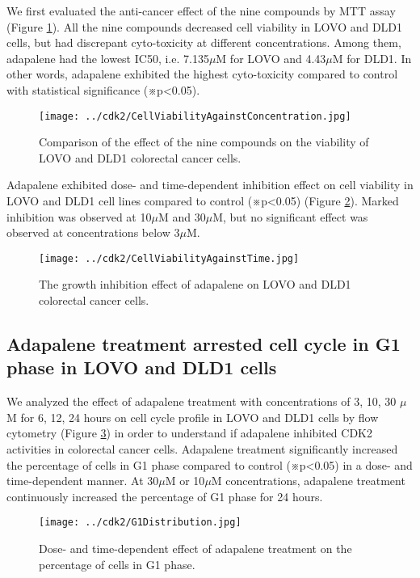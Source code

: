 We first evaluated the anti-cancer effect of the nine compounds by MTT assay (Figure \ref{cdk2:CellViabilityAgainstConcentration}). All the nine compounds decreased cell viability in LOVO and DLD1 cells, but had discrepant cyto-toxicity at different concentrations. Among them, adapalene had the lowest IC50, i.e. 7.135$\mu$M for LOVO and 4.43$\mu$M for DLD1. In other words, adapalene exhibited the highest cyto-toxicity compared to control with statistical significance (※p<0.05).

\begin{figure}
\centering
\texttt{[image: ../cdk2/CellViabilityAgainstConcentration.jpg]}
\caption{Comparison of the effect of the nine compounds on the viability of LOVO and DLD1 colorectal cancer cells.}
\label{cdk2:CellViabilityAgainstConcentration}
\end{figure}

Adapalene exhibited dose- and time-dependent inhibition effect on cell viability in LOVO and DLD1 cell lines compared to control (※p<0.05) (Figure \ref{cdk2:CellViabilityAgainstTime}). Marked inhibition was observed at 10$\mu$M and 30$\mu$M, but no significant effect was observed at concentrations below 3$\mu$M.

\begin{figure}
\centering
\texttt{[image: ../cdk2/CellViabilityAgainstTime.jpg]}
\caption{The growth inhibition effect of adapalene on LOVO and DLD1 colorectal cancer cells.}
\label{cdk2:CellViabilityAgainstTime}
\end{figure}

\subsection{Adapalene treatment arrested cell cycle in G1 phase in LOVO and DLD1 cells}

We analyzed the effect of adapalene treatment with concentrations of 3, 10, 30 $\mu$M for 6, 12, 24 hours on cell cycle profile in LOVO and DLD1 cells by flow cytometry (Figure \ref{cdk2:G1Distribution}) in order to understand if adapalene inhibited CDK2 activities in colorectal cancer cells. Adapalene treatment significantly increased the percentage of cells in G1 phase compared to control (※p<0.05) in a dose- and time-dependent manner. At 30$\mu$M or 10$\mu$M concentrations, adapalene treatment continuously increased the percentage of G1 phase for 24 hours.

\begin{figure}
\centering
\texttt{[image: ../cdk2/G1Distribution.jpg]}
\caption{Dose- and time-dependent effect of adapalene treatment on the percentage of cells in G1 phase.}
\label{cdk2:G1Distribution}
\end{figure}


